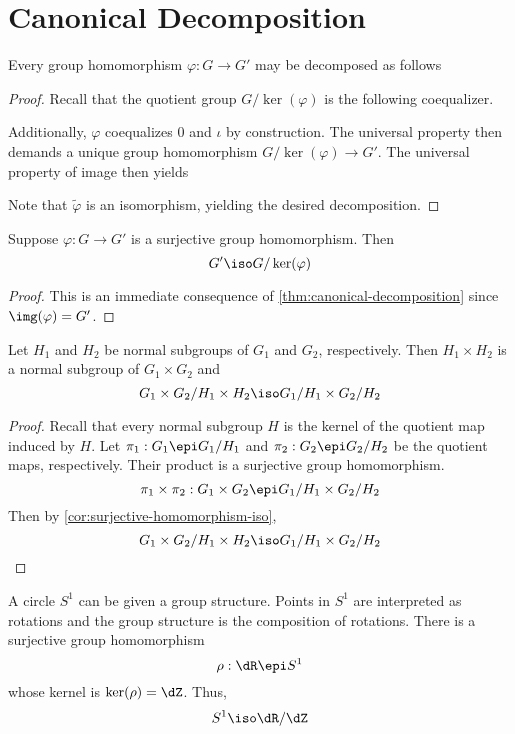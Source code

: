 \documentclass{amsart}
\begin{document}
\section{Canonical Decomposition}
\label{sec:canonical-decomposition}

\begin{thm}\label{thm:canonical-decomposition}
  Every group homomorphism $\varphi : G \to G'$ may be decomposed as follows
  
\end{thm}
\begin{proof}
  Recall that the quotient group $G/\ker(\varphi)$ is the following coequalizer.
  
  Additionally, $\varphi$ coequalizes $0$ and $\iota$ by construction.
  The universal property then demands a unique group homomorphism $G/\ker(\varphi) \to G'$.
  The universal property of image then yields
  
  Note that $\widetilde{\varphi}$ is an isomorphism, yielding the desired decomposition.
\end{proof}

\begin{cor}\label{cor:surjective-homomorphism-iso}
  Suppose $\varphi : G \to G'$ is a surjective group homomorphism.
  Then
  \[
    G' \iso G/\ker(\varphi)
  \]
\end{cor}
\begin{proof}
  This is an immediate consequence of \cref{thm:canonical-decomposition} since $\img(\varphi) = G'$.
\end{proof}

\begin{cor}
  Let $H_{1}$ and $H_{2}$ be normal subgroups of $G_{1}$ and $G_{2}$, respectively.
  Then $H_{1} \times H_{2}$ is a normal subgroup of $G_{1} \times G_{2}$ and
  \[
    G_{1} \times G_{2} / H_{1} \times H_{2} \iso G_{1} / H_{1} \times G_{2} / H_{2}
  \]
\end{cor}
\begin{proof}
  Recall that every normal subgroup $H$ is the kernel of the quotient map induced by $H$.
  Let $\pi_{1} : G_{1} \epi G_{1}/H_{1}$ and $\pi_{2} : G_{2} \epi G_{2}/H_{2}$ be the quotient maps, respectively.
  Their product is a surjective group homomorphism.
  \[
    \pi_{1} \times \pi_{2} : G_{1} \times G_{2} \epi G_{1}/H_{1} \times G_{2}/H_{2}
  \]
  Then by \cref{cor:surjective-homomorphism-iso},
  \[
    G_{1} \times G_{2} / H_{1} \times H_{2} \iso G_{1} / H_{1} \times G_{2} / H_{2}
  \]
\end{proof}

\begin{eg}
  A circle $S^{1}$ can be given a group structure.
  Points in $S^{1}$ are interpreted as rotations and the group structure is the composition of rotations.
  There is a surjective group homomorphism
  \[
    \rho : \dR \epi S^{1}
  \]
  whose kernel is $\ker(\rho) = \dZ$.
  Thus,
  \[
    S^{1} \iso \dR / \dZ
  \]
\end{eg}
\end{document}
